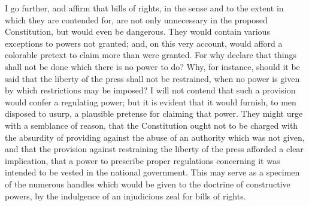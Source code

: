I go further, and affirm that bills of rights, in the sense and to the extent in which they are contended for, are not only unnecessary in the proposed Constitution, but would even be dangerous. They would contain various exceptions to powers not granted; and, on this very account, would afford a colorable pretext to claim more than were granted. For why declare that things shall not be done which there is no power to do? Why, for instance, should it be said that the liberty of the press shall not be restrained, when no power is given by which restrictions may be imposed? I will not contend that such a provision would confer a regulating power; but it is evident that it would furnish, to men disposed to usurp, a plausible pretense for claiming that power. They might urge with a semblance of reason, that the Constitution ought not to be charged with the absurdity of providing against the abuse of an authority which was not given, and that the provision against restraining the liberty of the press afforded a clear implication, that a power to prescribe proper regulations concerning it was intended to be vested in the national government. This may serve as a specimen of the numerous handles which would be given to the doctrine of constructive powers, by the indulgence of an injudicious zeal for bills of rights.

